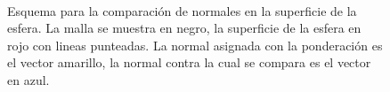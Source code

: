 \begin{figure}[htp]
  \begin{center}
    \hspace{8mm}
     \\
  \end{center}
  \caption[Esquema para la comparación de normales en la superficie de la esfera]{Esquema para la comparación de normales en la superficie de la esfera. La malla se muestra en negro, la superficie de la esfera en rojo con lineas punteadas. La normal asignada con la ponderación es el vector amarillo, la normal contra la cual se compara es el vector en azul.}
  \label{fig:nomalesProy}
\end{figure}

